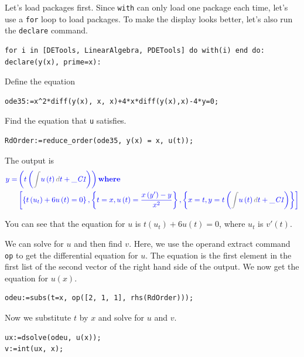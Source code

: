 \documentclass[
  12pt]{elegantbook}
\begin{document}
\begin{solution}

Let's load packages first. Since \texttt{with} can only load one package each time, let's use a \texttt{for} loop to load packages. To make the display looks better, let's also run the \texttt{declare} command.

\begin{verbatim}
for i in [DETools, LinearAlgebra, PDETools] do with(i) end do:
declare(y(x), prime=x):
\end{verbatim}

Define the equation

\begin{verbatim}
ode35:=x^2*diff(y(x), x, x)+4*x*diff(y(x),x)-4*y=0;
\end{verbatim}

Find the equation that \texttt{u} satisfies.

\begin{verbatim}
RdOrder:=reduce_order(ode35, y(x) = x, u(t));
\end{verbatim}

The output is
\[\color{blue}{
  \begin{aligned}
  y =& \left(t \left({\color{gray}{\int}}u  \left(t \right){\color{gray}{d}}t +\_\textit{C1} \right)\right)\boldsymbol{\mathrm{where}}\\
  &\left[\left\{t \left(u_{t}\right)+6 u  \left(t \right)=0\right\}, \left\{t =x , u  \left(t \right)=\frac{x \left({y'}\right)-y}{x^{2}}\right\}, \left\{x =t , y =t \left({\color{gray}{\int}}u  \left(t \right){\color{gray}{d}}t +\_\textit{C1} \right)\right\}\right]
  \end{aligned}
}\]

You can see that the equation for \(u\) is \(t \left(u_{t}\right)+6 u \left(t \right)=0\), where \(u_t\) is \(v'(t)\).

We can solve for \(u\) and then find \(v\). Here, we use the operand extract command \texttt{op} to get the differential equation for \(u\). The equation is the first element in the first list of the second vector of the right hand side of the output. We now get the equation for \(u(x)\).

\begin{verbatim}
odeu:=subs(t=x, op([2, 1, 1], rhs(RdOrder)));
\end{verbatim}

Now we substitute \(t\) by \(x\) and solve for \(u\) and \(v\).

\begin{verbatim}
ux:=dsolve(odeu, u(x));
v:=int(ux, x);
\end{verbatim}


\end{solution}
\end{document}
